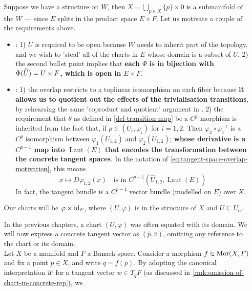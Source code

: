 \documentclass[../main-manifolds.tex]{subfiles}
\providecommand{\Laut}{\operatorname{Laut}}
\begin{document}
Suppose we have a structure on $W$, then $X=\bigcup_{p\in X}\{p\}\times 0$ is a submanifold of the $W$ --- since $E$ splits in the product space $E\times F$. Let us motivate a couple of the requirements above.
\begin{itemize}
    \item {}: 1) $U$ is required to be open because $W$ needs to inherit part of the topology, and we wish to 'steal' all of the charts in $E$ whose domain is a subset of $U$, 2) the second bullet point implies that \textbf{each $\Phi$ is in bijection with $\Phi(\widetilde{U}) = U\times F$, which is open in $E\times F$}.
    \item {}: 
    1) the overlap restricts to a toplinear isomorphism on each fiber because \textbf{it allows us to quotient out the effects of the trivialisation transitions}, by rehearsing the same 'coproduct and quotient' argument in .
    2) the requirement that $\theta$ as defined in \cref{def-transition-map} be a $C^p$ morphism is inherited from the fact that, if $p\in (U_i,\varphi_i)$ for $i=1,2$. Then $\varphi_2\circ \varphi_1^{-1}$ is a $C^p$ isomorphism between $\varphi_1(U_{1,2})$ and $\varphi_2(U_{1,2})$; \textbf{whose derivative is a $C^{p-1}$ map into $\Laut(E)$ that encodes the transformation between the concrete tangent spaces}. In the notation of \cref{eq:tangent-space-overlap-motivation}, this means
    \[
        x\mapsto D\varphi_{1,2}(x)\quad\text{is in } C^{p-1}(\hat{U}_{1,2}, \Laut(E))
    \]
    In fact, the tangent bundle is a $C^{p-1}$ vector bundle (modelled on $E$) over $X$.
\end{itemize}

Our charts will be $\varphi\times \operatorname{id}_{F}$, where $(U,\varphi)$ is in the structure of $X$ and $U\subseteq U_\alpha$.
% 


In the previous chapters, a chart $(U,\varphi)$ was often equated with its domain. We will now express a concrete tangent vector as $(\hat{p}, \hat{v})$, omitting any reference to the chart or its domain. \\

Let $X$ be a manifold and $F$ a Banach space. Consider a morphism $f \in \operatorname{Mor}(X,F)$ and fix a point $p \in X$, and write $q = f(p)$. By adopting the canonical interpretation $\overline{w}$ for a tangent vector $w \in T_q F$ (as discussed in \cref{rmk:omission-of-chart-in-concrete-rep}), we 
\end{document}
